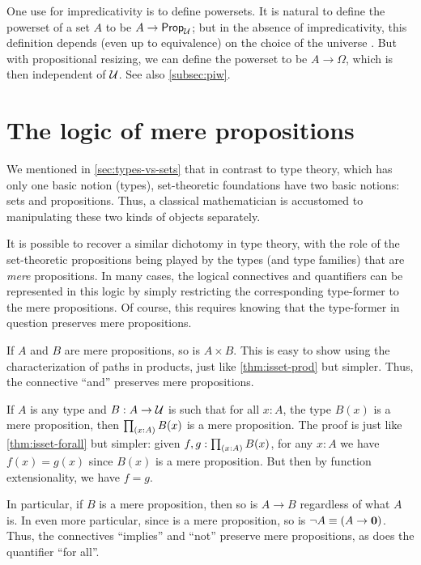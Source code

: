 One use for impredicativity is to define powersets.
It is natural to define the powerset of a set $A$ to be $A\to\mathsf{Prop}_\mathcal{U}$; but in the absence of impredicativity, this definition depends
(even up to equivalence) on the choice of the universe \UU. 
But with propositional resizing, we can define the powerset to be $A\to\Omega$, which is then independent of $\mathcal{U}$.
See also \autoref{subsec:piw}.


\section{The logic of mere propositions}
\label{subsec:logic-hprop}

We mentioned in \autoref{sec:types-vs-sets} that in contrast to type theory, which has only one basic notion (types), set-theoretic foundations have two basic notions: sets and propositions.
Thus, a classical mathematician is accustomed to manipulating these two kinds of objects separately.

It is possible to recover a similar dichotomy in type theory, with the role of the set-theoretic propositions being played by the types (and type families) that are \emph{mere} propositions.
In many cases, the logical connectives and quantifiers can be represented in this logic by simply restricting the corresponding type-former to the mere propositions.
Of course, this requires knowing that the type-former in question preserves mere propositions.

\begin{eg}
  If $A$ and $B$ are mere propositions, so is $A\times B$.
  This is easy to show using the characterization of paths in products, just like \autoref{thm:isset-prod} but simpler.
  Thus, the connective ``and'' preserves mere propositions.
\end{eg}

\begin{eg}\label{thm:isprop-forall}
  If $A$ is any type and $B:A\to \mathcal{U}$ is such that for all $x:A$, the type $B(x)$ is a mere proposition, then $\prd{x:A} B(x)$ is a mere proposition.
  The proof is just like \autoref{thm:isset-forall} but simpler: given $f,g:\prd{x:A} B(x)$, for any $x:A$ we have $f(x)=g(x)$ since $B(x)$ is a mere proposition.
  But then by function extensionality, we have $f=g$.

  In particular, if $B$ is a mere proposition, then so is $A\to B$ regardless of what $A$ is.
  In even more particular, since \emptyt is a mere proposition, so is $\neg A \equiv (A\to\mathbf{0})$.
  Thus, the connectives ``implies'' and ``not'' preserve mere propositions, as does the quantifier ``for all''.
\end{eg}

